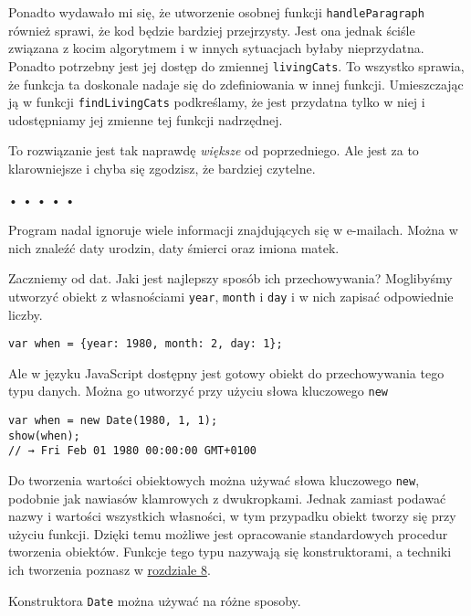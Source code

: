     
Ponadto wydawało mi się, że utworzenie osobnej funkcji \texttt{handleParagraph} również sprawi, że kod będzie bardziej przejrzysty. Jest ona jednak ściśle związana z kocim algorytmem i w innych sytuacjach byłaby nieprzydatna. Ponadto potrzebny jest jej dostęp do zmiennej \texttt{livingCats}. To wszystko sprawia, że funkcja ta doskonale nadaje się do zdefiniowania w innej funkcji. Umieszczając ją w funkcji \texttt{findLivingCats} podkreślamy, że jest przydatna tylko w niej i udostępniamy jej zmienne tej funkcji nadrzędnej.

    
To rozwiązanie jest tak naprawdę \emph{większe} od poprzedniego. Ale jest za to klarowniejsze i chyba się zgodzisz, że bardziej czytelne.

  
  
\begin{center}
• • • • •
\end{center}
  
    
Program nadal ignoruje wiele informacji znajdujących się w e-mailach. Można w nich znaleźć daty urodzin, daty śmierci oraz imiona matek.

    
Zaczniemy od dat. Jaki jest najlepszy sposób ich przechowywania? Moglibyśmy utworzyć obiekt z własnościami \texttt{year}, \texttt{month} i \texttt{day} i w nich zapisać odpowiednie liczby.

    
\begin{verbatim} 
var when = {year: 1980, month: 2, day: 1};
\end{verbatim}
    
Ale w języku JavaScript dostępny jest gotowy obiekt do przechowywania tego typu danych. Można go utworzyć przy użyciu słowa kluczowego \texttt{new}

    
\begin{verbatim} 
var when = new Date(1980, 1, 1);
show(when);
// → Fri Feb 01 1980 00:00:00 GMT+0100
\end{verbatim}
    
Do tworzenia wartości obiektowych można używać słowa kluczowego \texttt{new}, podobnie jak nawiasów klamrowych z dwukropkami. Jednak zamiast podawać nazwy i wartości wszystkich własności, w tym przypadku obiekt tworzy się przy użyciu funkcji. Dzięki temu możliwe jest opracowanie standardowych procedur tworzenia obiektów. Funkcje tego typu nazywają się konstruktorami, a techniki ich tworzenia poznasz w \hyperref[chap:8]{rozdziale 8}.

    
Konstruktora \texttt{Date} można używać na różne sposoby.

